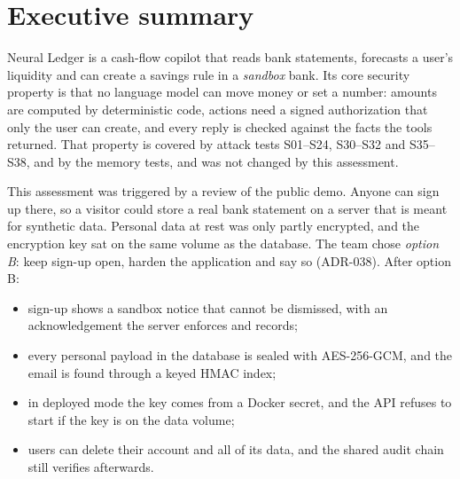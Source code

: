 \documentclass[11pt,a4paper]{article}
\begin{document}

\tableofcontents
\clearpage

\section{Executive summary}\label{sec:summary}

Neural Ledger is a cash-flow copilot that reads bank statements, forecasts a user's liquidity and can create a savings
rule in a \emph{sandbox} bank. Its core security property is that no language model can move money or set a number:
amounts are computed by deterministic code, actions need a signed authorization that only the user can create, and every
reply is checked against the facts the tools returned. That property is covered by attack tests S01--S24,
S30--S32 and S35--S38, and by the memory tests, and was not changed by this assessment.

This assessment was triggered by a review of the public demo. Anyone can sign up there, so a visitor could store a real
bank statement on a server that is meant for synthetic data. Personal data at rest was only partly encrypted, and the
encryption key sat on the same volume as the database. The team chose \emph{option B}: keep sign-up open, harden the
application and say so (ADR-038). After option B:

\begin{itemize}
  \item sign-up shows a sandbox notice that cannot be dismissed, with an acknowledgement the server enforces and records;
  \item every personal payload in the database is sealed with AES-256-GCM, and the email is found through a keyed HMAC index;
  \item in deployed mode the key comes from a Docker secret, and the API refuses to start if the key is on the data volume;
  \item users can delete their account and all of its data, and the shared audit chain still verifies afterwards.
\end{itemize}
\end{document}
